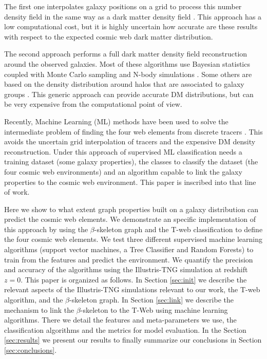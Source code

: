 \documentclass[usenatbib]{mnras}
\begin{document}
The first one interpolates galaxy positions on a grid to process
this number density field in the same way as a dark matter density
field \citep{Eardley2015,Alpaslan2016,Tojeiro2017,Shadab2019}.
This approach has a low computational cost, but it is highly uncertain
how accurate are these results with respect to the expected  cosmic
web dark matter distribution. 

The second approach performs a full dark matter density field
reconstruction around the observed galaxies.
Most of these algorithms use Bayesian statistics coupled with Monte
Carlo sampling  and N-body
simulations \citep{Jasche2010,Jasche2013a,Bos2014,LeclercqJasche2015,Horowitz2019,Burchett2020}. 
Some others are based on the density distribution around halos that
are associated to galaxy groups \citep{Wang2009,2011MNRAS.417.1303M}.  
This generic approach can provide accurate DM distributions, but can
be very expensive from the computational point of view. 

Recently, Machine Learning (ML) methods have been used to solve the
intermediate problem of finding the four web elements from discrete
tracers \citep{Hui2018}. 
This avoids the uncertain grid interpolation of tracers and the expensive
DM density reconstruction.
Under this approach of supervised ML classification needs a training
dataset (some galaxy properties), the classes to classify the dataset
(the four cosmic web environments) and an algorithm capable to link
the galaxy properties to the cosmic web environment.
This paper is inscribed into that line of work.


Here we show to what extent graph properties built on a galaxy
distribution can predict the cosmic web elements.
We demonstrate an specific implementation of this approach by using
the $\beta$-skeleton graph \citep{Fang2019} and the  T-web
\citep{Forero-Romero2009} classification to define the four cosmic web
elements.  
We test three different supervised machine learning
algorithms (support vector machines, a Tree Classifier and Random Forests) 
to train from the features and predict the environment.
We quantify the precision and accuracy of the algorithms using the
Illustris-TNG simulation \citep{Nelson2015} at redshift $z=0$. 
This paper is organized as follows. 
In Section \ref{sec:init} we describe the relevant aspects of the Illustris-TNG
simulations relevant to our work, the T-web algorithm,
and the $\beta$-skeleton graph.
In Section \ref{sec:link} we describe the mechanism to link the
$\beta$-skeleton to the T-Web using machine learning algorithms.
There we detail the features and meta-parameters we use, the
classification algorithms and the metrics for model evaluation.  
In the Section \ref{sec:results} we present our results
to finally summarize our conclusions in Section
\ref{sec:conclusions}.
\end{document}
